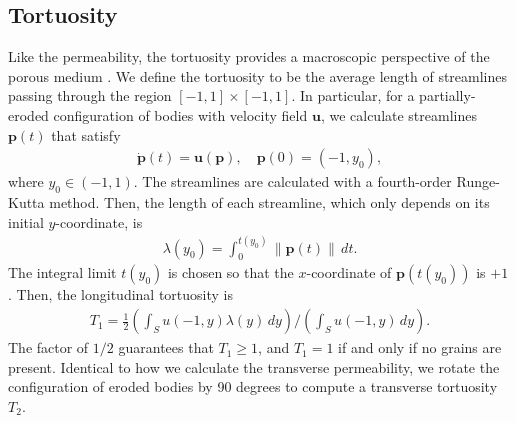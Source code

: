 \documentclass[3p]{elsarticle}
\newcommand{\pp}{{\mathbf{p}}}
\newcommand{\uu}{{\mathbf{u}}}
\newcommand{\anis}{\mathcal{A}}
\newcommand{\anistort}{\mathcal{A_T}}
\begin{document}
%

\subsection{Tortuosity}
%

Like the permeability, the tortuosity provides a macroscopic perspective
of the porous medium \cite{souzy2020velocity}. We define the tortuosity to be the average length
of streamlines passing through the region $[-1,1] \times [-1,1]$. In
particular, for a partially-eroded configuration of bodies with velocity field $\uu$,
we calculate streamlines $\pp(t)$ that satisfy
\begin{align}
  \dot{\pp}(t) = \uu(\pp), \quad \pp(0) = (-1,y_0),
\end{align}
where $y_0 \in (-1,1)$. The streamlines are calculated with a fourth-order Runge-Kutta method. Then, the length of each streamline, which only depends on its initial $y$-coordinate, is
\begin{align}
  \lambda(y_0) = \int_{0}^{t(y_0)} \|\pp(t)\| \,dt.
\end{align}
The integral limit $t(y_0)$ is chosen so that the $x$-coordinate of
$\pp(t(y_0))$ is $+1$. Then, the longitudinal tortuosity is
\begin{align}
  T_1 = \frac{1}{2}\left(\int_{S}u(-1,y)\lambda(y)\,dy \right)
  \Bigg/
  \left(\int_{S}u(-1,y)\,dy \right).
  \label{eqn:tortuosity_x}
\end{align} 
The factor of $1/2$ guarantees that $T_1 \geq 1$, and $T_1 = 1$ if and only if no grains are present. Identical to how we calculate the transverse permeability, we rotate the configuration of eroded bodies by 90 degrees to compute a transverse tortuosity $T_2$.

\end{document}
